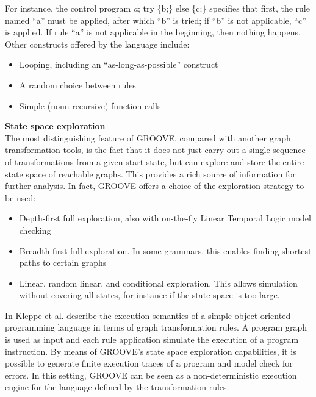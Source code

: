 For instance, the control program \emph{a}; try \{b;\} else \{c;\} specifies that first, the rule named \enquote{a} must be applied, after which \enquote{b} is tried; if \enquote{b} is not applicable, \enquote{c} is applied. If rule \enquote{a} is not applicable in the beginning, then nothing happens. Other constructs offered by the language include:
\begin{itemize}
\item Looping, including an \enquote{as-long-as-possible} construct
\item A random choice between rules
\item Simple (noun-recursive) function calls
\end{itemize}
\textbf{State space exploration}\\ 
The most distinguishing feature of GROOVE, compared with another graph transformation tools, is the fact that it does not just carry out a single sequence of transformations from a given start state, but can explore and store the entire state space of reachable graphs. This provides a rich source of information for further analysis. In fact, GROOVE offers a choice of the exploration strategy to be used:
\begin{itemize}
\item Depth-first full exploration, also with on-the-fly Linear Temporal Logic model checking
\item Breadth-first full exploration. In some grammars, this enables finding shortest paths to certain graphs
\item Linear, random linear, and conditional exploration. This allows simulation without covering all states, for instance if the state space is too large.
\end{itemize}
In \cite{lucassen2016improving} Kleppe et al. describe the execution semantics of a simple object-oriented programming language in terms of graph transformation rules. A program graph is used as input and each rule application simulate the execution of a program instruction. By means of GROOVE’s state space exploration capabilities, it is possible to generate finite execution traces of a program and model check for errors. In this setting, GROOVE can be seen as a non-deterministic execution engine for the language defined by the transformation rules.


